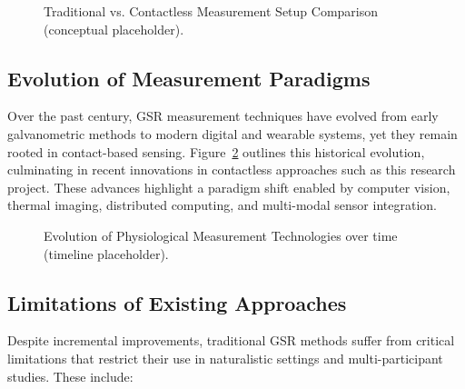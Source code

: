 \documentclass[11pt,a4paper]{report}
\begin{document}
\begin{figure}[h]
\centering
\fbox{\rule{0pt}{0.2\textheight}\rule{0.8\textwidth}{0pt}}
\caption{Traditional vs. Contactless Measurement Setup Comparison (conceptual placeholder).}
\label{fig:traditional_contactless}
\end{figure} \subsection{Evolution of Measurement Paradigms}
Over the past century, GSR measurement techniques have evolved from early galvanometric methods to modern digital and wearable systems, yet they remain rooted in contact-based sensing. Figure~\ref{fig:evolution_timeline} outlines this historical evolution, culminating in recent innovations in contactless approaches such as this research project. These advances highlight a paradigm shift enabled by computer vision, thermal imaging, distributed computing, and multi-modal sensor integration. %
\begin{figure}[h]
\centering
\fbox{\rule{0pt}{0.15\textheight}\rule{0.8\textwidth}{0pt}}
\caption{Evolution of Physiological Measurement Technologies over time (timeline placeholder).}
\label{fig:evolution_timeline}
\end{figure} \subsection{Limitations of Existing Approaches}
Despite incremental improvements, traditional GSR methods suffer from critical limitations that restrict their use in naturalistic settings and multi-participant studies. These include:
\end{document}
